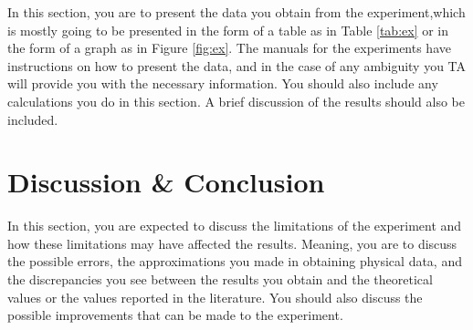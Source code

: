 \documentclass[10pt]{article}
\begin{document}
In this section, you are to present the data you obtain from the experiment,which is mostly going to be presented in the form of a table as in Table \ref{tab:ex} or in the form of a graph as in Figure \ref{fig:ex}. The manuals for the experiments have instructions on how to present the data, and in the case of any ambiguity you TA will provide you with the necessary information. You should also include any calculations you do in this section. A brief discussion of the results should also be included.

\section{Discussion \& Conclusion}

In this section, you are expected to discuss the limitations of the experiment and how these limitations may have affected the results. Meaning, you are to discuss the possible errors, the approximations you made in obtaining physical data, and the discrepancies you see between the results you obtain and the theoretical values or the values reported in the literature. You should also discuss the possible improvements that can be made to the experiment. 

\printbibliography

\end{document}
